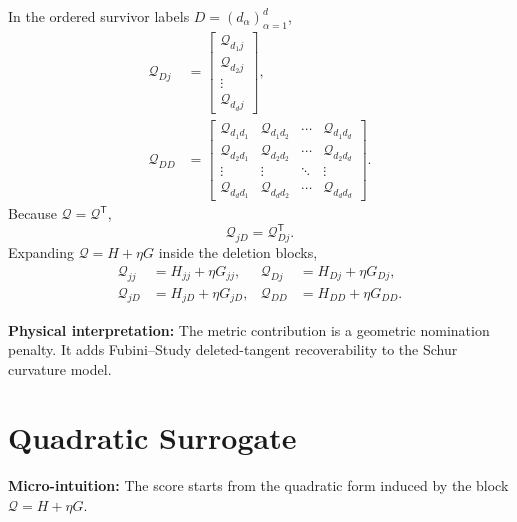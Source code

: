 \documentclass[10pt,twocolumn]{article}
\newcommand{\blocktitle}[1]{\vspace{2pt}\noindent\textbf{#1}\space}
\newcommand{\micro}[1]{\blocktitle{Micro-intuition:} #1}
\newcommand{\phys}[1]{\blocktitle{Physical interpretation:} #1}
\begin{document}
In the ordered survivor labels \(D=(d_\alpha)_{\alpha=1}^{d}\),
\[
\begin{aligned}
\mathcal Q_{Dj}
&=
\begin{bmatrix}
\mathcal Q_{d_1j}\\
\mathcal Q_{d_2j}\\
\vdots\\
\mathcal Q_{d_dj}
\end{bmatrix},
\\
\mathcal Q_{DD}
&=
\begin{bmatrix}
\mathcal Q_{d_1d_1} & \mathcal Q_{d_1d_2} & \cdots & \mathcal Q_{d_1d_d}\\
\mathcal Q_{d_2d_1} & \mathcal Q_{d_2d_2} & \cdots & \mathcal Q_{d_2d_d}\\
\vdots & \vdots & \ddots & \vdots\\
\mathcal Q_{d_dd_1} & \mathcal Q_{d_dd_2} & \cdots & \mathcal Q_{d_dd_d}
\end{bmatrix}.
\end{aligned}
\]
Because \(\mathcal Q=\mathcal Q^{\mathsf T}\),
\[
\mathcal Q_{jD}=\mathcal Q_{Dj}^{\mathsf T}.
\]
Expanding \(\mathcal Q=H+\eta G\) inside the deletion blocks,
\[
\begin{aligned}
\mathcal Q_{jj}&=H_{jj}+\eta G_{jj},
&
\mathcal Q_{Dj}&=H_{Dj}+\eta G_{Dj},
\\
\mathcal Q_{jD}&=H_{jD}+\eta G_{jD},
&
\mathcal Q_{DD}&=H_{DD}+\eta G_{DD}.
\end{aligned}
\]

\phys{The metric contribution is a geometric nomination penalty. It adds Fubini--Study deleted-tangent recoverability to the Schur curvature model.}

\section*{Quadratic Surrogate}

\micro{The score starts from the quadratic form induced by the block \(\mathcal Q=H+\eta G\).}
\end{document}
